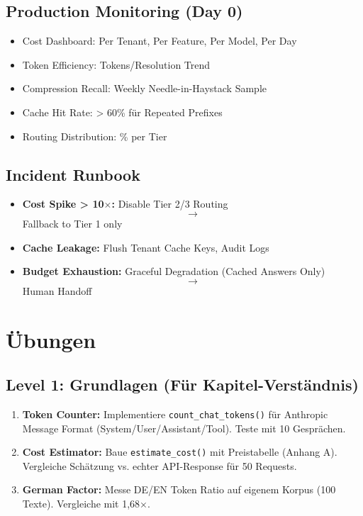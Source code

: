\subsection{Production Monitoring (Day 0)}
\label{sec:prod_monitoring}

\begin{itemize}[leftmargin=*]
  \item [ ] Cost Dashboard: Per Tenant, Per Feature, Per Model, Per Day
  \item [ ] Token Efficiency: Tokens/Resolution Trend
  \item [ ] Compression Recall: Weekly Needle-in-Haystack Sample
  \item [ ] Cache Hit Rate: > 60\% für Repeated Prefixes
  \item [ ] Routing Distribution: \% per Tier
\end{itemize}

\subsection{Incident Runbook}
\label{sec:incident_runbook}

\begin{itemize}[leftmargin=*]
  \item \textbf{Cost Spike > 10$\times$:} Disable Tier 2/3 Routing $$\to$$ Fallback to Tier 1 only
  \item \textbf{Cache Leakage:} Flush Tenant Cache Keys, Audit Logs
  \item \textbf{Budget Exhaustion:} Graceful Degradation (Cached Answers Only) $$\to$$ Human Handoff
\end{itemize}

\section{Übungen}
\label{sec:exercises}

\subsection{Level 1: Grundlagen (Für Kapitel-Verständnis)}
\label{sec:ex_level1}

\begin{enumerate}[leftmargin=*]
  \item \textbf{Token Counter:} Implementiere \texttt{count\_chat\_tokens()} für Anthropic Message Format (System/User/Assistant/Tool). Teste mit 10 Gesprächen.
  \item \textbf{Cost Estimator:} Baue \texttt{estimate\_cost()} mit Preistabelle (Anhang A). Vergleiche Schätzung vs. echter API-Response für 50 Requests.
  \item \textbf{German Factor:} Messe DE/EN Token Ratio auf eigenem Korpus (100 Texte). Vergleiche mit 1,68$\times$.
\end{enumerate}

